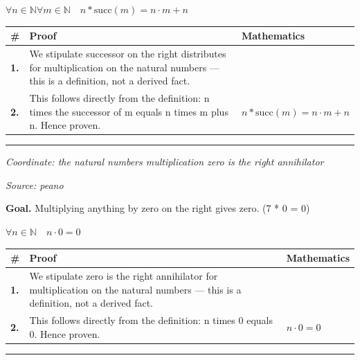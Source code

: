 \documentclass[11pt]{article}
\theoremstyle{definition}
\begin{document}
\noindent$\displaystyle \forall n \in \mathbb{N} \forall m \in \mathbb{N}\quad n * \mathrm{succ}(m) = n \cdot m + n$\par
\medskip
\noindent
\begin{tabular}{@{} >{\raggedright\arraybackslash}p{} >{\raggedright\arraybackslash}p{} >{\raggedleft\arraybackslash}p{} @{}}
\textbf{\#} & \textbf{Proof} & \textbf{Mathematics} \\
\midrule
\textbf{1.} & We stipulate successor on the right distributes for multiplication on the natural numbers — this is a definition, not a derived fact. & \\[0.45em]
\textbf{2.} & This follows directly from the definition: n times the successor of m equals n times m plus n. Hence proven. & $\displaystyle n * \mathrm{succ}(m) = n \cdot m + n$ \\[0.45em]
\bottomrule
\end{tabular}
\label{thm:Nat-multiplication-successor_on_the_right_distributes}
\par\medskip\hrule
\bigskip
{}\par
\smallskip\noindent\textit{Coordinate: the natural numbers \cdot multiplication \cdot zero is the right annihilator}\par
\smallskip\noindent\textit{Source: peano}\par
\medskip
\noindent\textbf{Goal.} Multiplying anything by zero on the right gives zero.  (7 * 0 = 0)\par
\noindent$\displaystyle \forall n \in \mathbb{N}\quad n \cdot 0 = 0$\par
\medskip
\noindent
\begin{tabular}{@{} >{\raggedright\arraybackslash}p{} >{\raggedright\arraybackslash}p{} >{\raggedleft\arraybackslash}p{} @{}}
\textbf{\#} & \textbf{Proof} & \textbf{Mathematics} \\
\midrule
\textbf{1.} & We stipulate zero is the right annihilator for multiplication on the natural numbers — this is a definition, not a derived fact. & \\[0.45em]
\textbf{2.} & This follows directly from the definition: n times 0 equals 0. Hence proven. & $\displaystyle n \cdot 0 = 0$ \\[0.45em]
\bottomrule
\end{tabular}
\label{thm:Nat-multiplication-zero_is_the_right_annihilator}
\par\medskip\hrule
\end{document}
